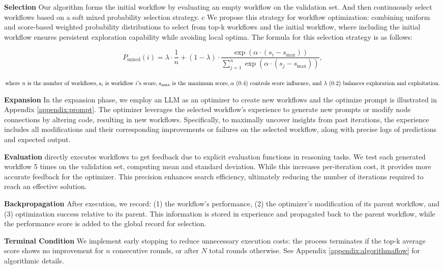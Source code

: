 \textbf{Selection}
Our algorithm forms the initial workflow by evaluating an empty workflow on the validation set. And then continuously select workflows based on a soft mixed probability selection strategy. 
c%
We propose this strategy for workflow optimization: combining uniform and score-based weighted probability distributions to select from top-k workflows and the initial workflow, where including the initial workflow ensures persistent exploration capability while avoiding local optima. The formula for this selection strategy is as follows:

\begin{equation}
P_{\text{mixed}}(i) = \lambda \cdot \frac{1}{n} + (1 - \lambda) \cdot \frac{\exp(\alpha \cdot (s_i - s_{\text{max}}))}{\sum_{j=1}^{n} \exp(\alpha \cdot (s_j - s_{\text{max}}))},
\end{equation}

\vspace{-2pt}

$\text{where } n \text{ is the number of workflows}, s_i \text{ is workflow } i \text{'s score}, s_{\text{max}} \text{ is the maximum score}, \alpha \text{ }(0.4) \\ \text{ controls } 
\text{score influence, and } \lambda \text{ }(0.2) \text{ balances exploration and exploitation}.$

\textbf{Expansion}
In the expansion phase, we employ an LLM as an optimizer to create new workflows and the optimize prompt is illustrated in Appendix \ref{appendix:prompt}. The optimizer leverages the selected workflow's experience to generate new prompts or modify node connections by altering code, resulting in new workflows. Specifically, to maximally uncover insights from past iterations, the experience includes all modifications and their corresponding improvements or failures on the selected workflow, along with precise logs of predictions and expected output.

\textbf{Evaluation}
\model directly executes workflows to get feedback due to explicit evaluation functions in reasoning tasks. We test each generated workflow 5 times on the validation set, computing mean and standard deviation. While this increases per-iteration cost, it provides more accurate feedback for the optimizer. This precision enhances search efficiency, ultimately reducing the number of iterations required to reach an effective solution.

\textbf{Backpropagation}
After execution, we record: (1) the workflow's performance, (2) the optimizer's modification of its parent workflow, and (3) optimization success relative to its parent. This information is stored in experience and propagated back to the parent workflow, while the performance score is added to the global record for selection.

\textbf{Terminal Condition}
We implement early stopping to reduce unnecessary execution costs: the process terminates if the top-k average score shows no improvement for $n$ consecutive rounds, or after $N$ total rounds otherwise. See Appendix \ref{appendix:algorithmaflow} for algorithmic details.
